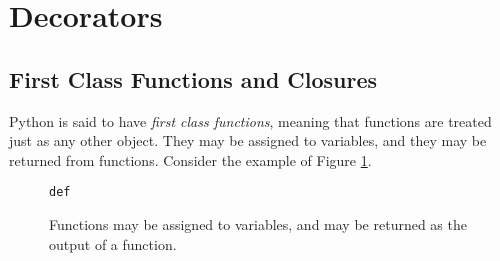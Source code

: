 \section{Decorators}
\label{sec:decorators}

\subsection{First Class Functions and Closures}
\label{sec:first-class-closure}

Python is said to have \emph{first class functions}, meaning that functions are treated just as any other object. They may be assigned to variables, and they may be returned from functions. Consider the example of Figure \ref{fig:first-class-functions}.

\begin{figure}[h]
  \centering
\begin{verbatim}
def 
\end{verbatim}
  \caption{Functions may be assigned to variables, and may be returned as the output of a function.}
  \label{fig:first-class-functions}
\end{figure}

